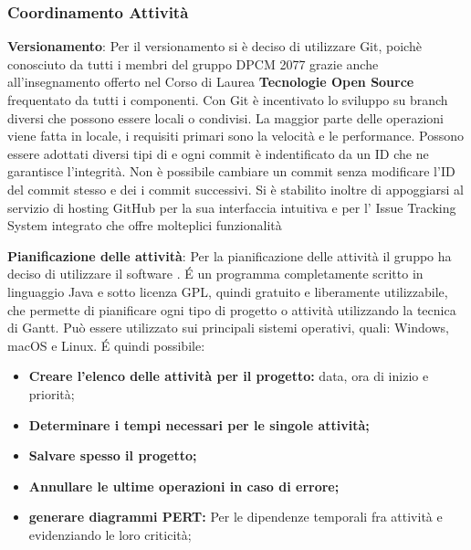 \subsubsection{Coordinamento Attività}
\begin{description}
\item{\textbf{Versionamento}}: Per il versionamento si è deciso di utilizzare Git, poichè conosciuto da tutti i membri del gruppo DPCM 2077 grazie anche all'insegnamento offerto
nel Corso di Laurea \textbf{Tecnologie Open Source} frequentato da tutti i componenti. Con Git è incentivato lo sviluppo su branch diversi che possono essere locali o condivisi.
La maggior parte delle operazioni viene fatta in locale, i requisiti primari sono la velocità e le performance.
Possono essere adottati diversi tipi di  e ogni commit è indentificato da un ID che ne garantisce l'integrità.
Non è possibile cambiare un commit senza modificare l’ID del commit stesso e dei i commit successivi.  
Si è stabilito inoltre di appoggiarsi al servizio di hosting GitHub per la sua interfaccia intuitiva e per l' Issue Tracking System integrato che offre molteplici funzionalità

\item{\textbf{Pianificazione delle attività}}:  Per la pianificazione delle attività il gruppo ha deciso di utilizzare il software \textbf{}. 
\'E un programma completamente scritto in linguaggio Java e sotto licenza GPL, quindi gratuito e liberamente utilizzabile, che permette di pianificare ogni tipo di progetto o attività utilizzando la tecnica di Gantt.
Può essere utilizzato sui principali sistemi operativi, quali: Windows, macOS e Linux.
\'E quindi possibile:
\begin{itemize}
\item{\textbf{Creare l'elenco delle attività per il progetto:} data, ora di inizio e priorità;}
\item{\textbf{Determinare i tempi necessari per le singole attività;}}
\item{\textbf{Salvare spesso il progetto;}}
\item{\textbf{Annullare le ultime operazioni in caso di errore;}}
\item{\textbf{generare diagrammi PERT:} Per le dipendenze temporali fra attività e evidenziando le loro criticità;}
\end{itemize} 


\end{description}
